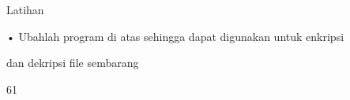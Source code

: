 \documentclass{article}
\begin{document}

Latihan

• Ubahlah program di atas sehingga dapat digunakan untuk enkripsi 

dan dekripsi file sembarang

61
\end{document}
